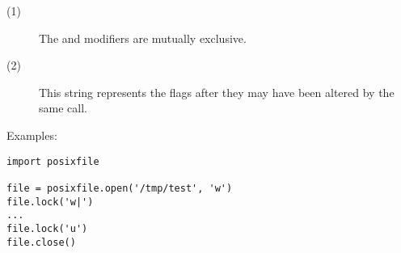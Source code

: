 \begin{description}
\item[(1)] The \samp{!} and \samp{=} modifiers are mutually exclusive.

\item[(2)] This string represents the flags after they may have been altered
by the same call.
\end{description}

Examples:

\begin{verbatim}
import posixfile

file = posixfile.open('/tmp/test', 'w')
file.lock('w|')
...
file.lock('u')
file.close()
\end{verbatim}
